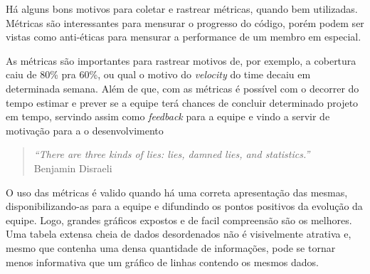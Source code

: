 


Há alguns bons motivos para coletar e rastrear métricas, quando bem utilizadas. Métricas são interessantes para mensurar o progresso do código, porém podem ser vistas como anti-éticas para mensurar a performance de um membro em especial\cite{crispin2009agile}.

As métricas são importantes para rastrear motivos de, por exemplo, a cobertura caiu de 80\% pra 60\%, ou qual o motivo do \textit{velocity} do time decaiu em determinada semana.
Além de que, com as métricas é possível com o decorrer do tempo estimar e prever se a equipe terá chances de concluir determinado projeto em tempo, servindo assim como \textit{feedback} para a equipe e vindo a servir de motivação para a o desenvolvimento

\begin{quote}
	\textit{“There are three kinds of lies: lies, damned lies, and statistics.”}\\Benjamin Disraeli
\end{quote}

O uso das métricas  é valido quando há uma correta apresentação das mesmas, disponibilizando-as para a equipe e difundindo os pontos positivos da evolução da equipe. Logo, grandes gráficos expostos e de facil compreensão são os melhores. Uma tabela extensa cheia de dados desordenados não é visivelmente atrativa e, mesmo que contenha uma densa quantidade de informações, pode se tornar menos informativa que um gráfico de linhas contendo os mesmos dados.

